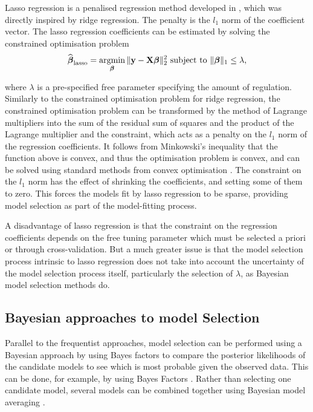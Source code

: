 Lasso regression is a penalised regression method developed in
\cite{Tibshirani1996}, which was directly inspired by ridge regression.  The
penalty is the $l_1$ norm of the coefficient vector.  The lasso regression
coefficients can be estimated by solving the constrained optimisation problem
$$
\widehat{\vbeta}_{\text{lasso}} = \argmin_\vbeta \|\vy - \mX \vbeta\|_2^2 \text{ subject to } \|\vbeta\|_1 \leq \lambda,
$$

\noindent 
where $\lambda$ is a pre-specified free parameter specifying the amount of
regulation. Similarly to the constrained optimisation problem for ridge
regression, the constrained optimisation problem can be transformed by the
method of Lagrange multipliers into the sum of the residual sum of squares and
the product of the Lagrange multiplier and the constraint, which acts as a
penalty on the $l_1$ norm of the regression coefficients. It follows from
Minkowski's inequality that the function above is convex, and thus the
optimisation problem is convex, and can be solved using standard methods from
convex optimisation \citep{Boyd2010}.  The constraint on the $l_1$ norm has the
effect of shrinking the coefficients, and setting some of them to zero. This
forces the models fit by lasso regression to be sparse, providing model
selection as part of the model-fitting process.

A disadvantage of lasso regression is that the constraint on the regression
coefficients depends on the free tuning parameter which must be selected a
priori or through cross-validation. But a much greater issue is that the model
selection process intrinsic to lasso regression does not take into account the
uncertainty of the model selection process itself, particularly the selection of
$\lambda$, as Bayesian model selection methods do.

\subsection{Bayesian approaches to model Selection}

Parallel to the frequentist approaches, model selection can be performed using
a Bayesian approach by using Bayes factors to compare the posterior likelihoods
of the candidate models to see which is most probable given the observed data.
This can be done, for example, by using Bayes Factors \citep{Kass1993}. Rather
than selecting one candidate model, several models can be combined together
using Bayesian model  averaging \citep{Hoeting1999, Raftery1997,
Fernandez2001, Papaspiliopoulos2016}.

